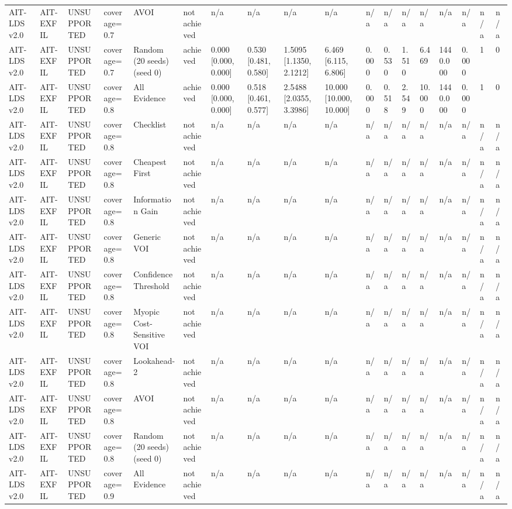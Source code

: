 \begin{table}[!ht]
{\begin{tabular}{llllllllllllllllll}
AIT-LDS v2.0 & AIT-EXFIL & UNSUPPORTED & coverage=0.7 & AVOI & not achieved & n/a & n/a & n/a & n/a & n/a & n/a & n/a & n/a & n/a & n/a & n/a & n/a \\
AIT-LDS v2.0 & AIT-EXFIL & UNSUPPORTED & coverage=0.7 & Random (20 seeds) (seed 0) & achieved & 0.000 [0.000, 0.000] & 0.530 [0.481, 0.580] & 1.5095 [1.1350, 2.1212] & 6.469 [6.115, 6.806] & 0.000 & 0.530 & 1.510 & 6.469 & 1440.000 & 0.000 & 1 & 0 \\
AIT-LDS v2.0 & AIT-EXFIL & UNSUPPORTED & coverage=0.8 & All Evidence & achieved & 0.000 [0.000, 0.000] & 0.518 [0.461, 0.577] & 2.5488 [2.0355, 3.3986] & 10.000 [10.000, 10.000] & 0.000 & 0.518 & 2.549 & 10.000 & 1440.000 & 0.000 & 1 & 0 \\
AIT-LDS v2.0 & AIT-EXFIL & UNSUPPORTED & coverage=0.8 & Checklist & not achieved & n/a & n/a & n/a & n/a & n/a & n/a & n/a & n/a & n/a & n/a & n/a & n/a \\
AIT-LDS v2.0 & AIT-EXFIL & UNSUPPORTED & coverage=0.8 & Cheapest First & not achieved & n/a & n/a & n/a & n/a & n/a & n/a & n/a & n/a & n/a & n/a & n/a & n/a \\
AIT-LDS v2.0 & AIT-EXFIL & UNSUPPORTED & coverage=0.8 & Information Gain & not achieved & n/a & n/a & n/a & n/a & n/a & n/a & n/a & n/a & n/a & n/a & n/a & n/a \\
AIT-LDS v2.0 & AIT-EXFIL & UNSUPPORTED & coverage=0.8 & Generic VOI & not achieved & n/a & n/a & n/a & n/a & n/a & n/a & n/a & n/a & n/a & n/a & n/a & n/a \\
AIT-LDS v2.0 & AIT-EXFIL & UNSUPPORTED & coverage=0.8 & Confidence Threshold & not achieved & n/a & n/a & n/a & n/a & n/a & n/a & n/a & n/a & n/a & n/a & n/a & n/a \\
AIT-LDS v2.0 & AIT-EXFIL & UNSUPPORTED & coverage=0.8 & Myopic Cost-Sensitive VOI & not achieved & n/a & n/a & n/a & n/a & n/a & n/a & n/a & n/a & n/a & n/a & n/a & n/a \\
AIT-LDS v2.0 & AIT-EXFIL & UNSUPPORTED & coverage=0.8 & Lookahead-2 & not achieved & n/a & n/a & n/a & n/a & n/a & n/a & n/a & n/a & n/a & n/a & n/a & n/a \\
AIT-LDS v2.0 & AIT-EXFIL & UNSUPPORTED & coverage=0.8 & AVOI & not achieved & n/a & n/a & n/a & n/a & n/a & n/a & n/a & n/a & n/a & n/a & n/a & n/a \\
AIT-LDS v2.0 & AIT-EXFIL & UNSUPPORTED & coverage=0.8 & Random (20 seeds) (seed 0) & not achieved & n/a & n/a & n/a & n/a & n/a & n/a & n/a & n/a & n/a & n/a & n/a & n/a \\
AIT-LDS v2.0 & AIT-EXFIL & UNSUPPORTED & coverage=0.9 & All Evidence & not achieved & n/a & n/a & n/a & n/a & n/a & n/a & n/a & n/a & n/a & n/a & n/a & n/a \\

\end{tabular}}
\end{table}
